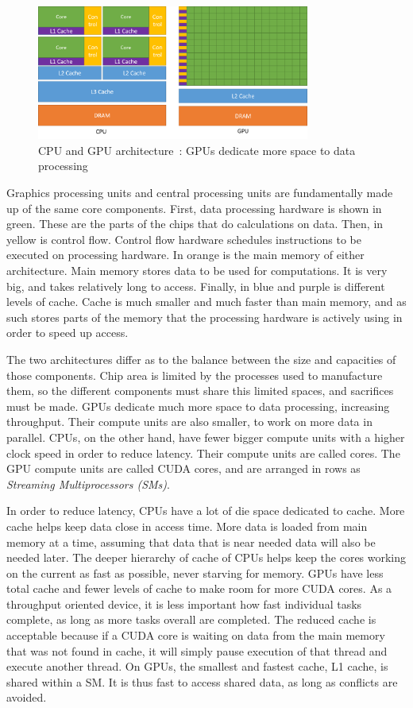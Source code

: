 \begin{figure}[H]
	\centering
	\includegraphics[width=0.8\textwidth]{Chapter_graphics_processing_units/media/gpu-devotes-more-transistors-to-data-processing}
	\caption{CPU and GPU architecture~\cite{Nvidia2021}: GPUs dedicate more space to data processing}
	\label{fig:cpu_gpu}
\end{figure}

Graphics processing units and central processing units are fundamentally made up of the same core
components. First, data processing hardware is shown in green. These are the parts of the chips that
do calculations on data. Then, in yellow is control flow. Control flow hardware schedules
instructions to be executed on processing hardware. In orange is the main memory of either
architecture. Main memory stores data to be used for computations. It is very big, and takes
relatively long to access. Finally, in blue and purple is different levels of cache. Cache is much
smaller and much faster than main memory, and as such stores parts of the memory that the processing
hardware is actively using in order to speed up access.

The two architectures differ as to the balance between the size and capacities of those components.
Chip area is limited by the processes used to manufacture them, so the different components must
share this limited spaces, and sacrifices must be made. GPUs dedicate much more space to data
processing, increasing throughput. Their compute units are also smaller, to work on more data in
parallel. CPUs, on the other hand, have fewer bigger compute units with a higher clock speed in
order to reduce latency. Their compute units are called cores. The GPU compute units are called CUDA
cores, and are arranged in rows as \textit{Streaming Multiprocessors (SMs)}.

In order to reduce latency, CPUs have a lot of die space dedicated to cache. More cache helps keep
data close in access time. More data is loaded from main memory at a time, assuming that data that
is near needed data will also be needed later. The deeper hierarchy of cache of CPUs helps keep the
cores working on the current as fast as possible, never starving for memory. GPUs have less total
cache and fewer levels of cache to make room for more CUDA cores. As a throughput oriented device,
it is less important how fast individual tasks complete, as long as more tasks overall are
completed. The reduced cache is acceptable because if a CUDA core is waiting on data from the main
memory that was not found in cache, it will simply pause execution of that thread and execute
another thread. On GPUs, the smallest and fastest cache, L1 cache, is shared within a SM. It is thus
fast to access shared data, as long as conflicts are avoided.

